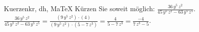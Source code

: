 \begin{MAufgabe}{Kuerzen}{kr, dh, MaTeX}
K\"urzen Sie soweit m\"oglich: $\frac{36\, y^5\, z^2}{45\, y^5\, z^2 - 63\, y^5\, z^5}$.\\ 
\ifLsg\MLoesung
\quad $\frac{36\, y^5\, z^2}{45\, y^5\, z^2 - 63\, y^5\, z^5}=\frac{(9\, y^5\, z^2)\cdot(4)}{(9\, y^5\, z^2)\cdot(5 - 7\, z^3)}=\frac{4}{5 - 7\, z^3}=\frac{-4}{7\, z^3 - 5}$.\else\relax\fi
 \end{MAufgabe}
